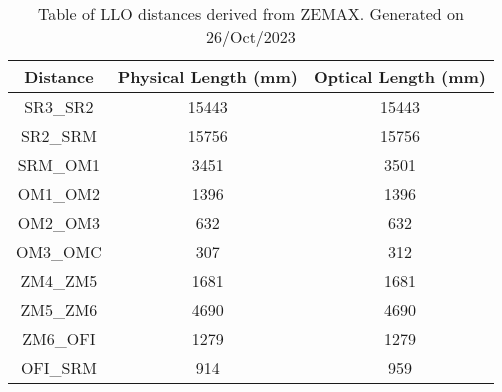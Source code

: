 \documentclass{article}
\begin{document}
\begin{table}[h!] 
\centering  
\begin{tabular}{| c| c | c |} 
\hline \bf{Distance} & \bf{Physical Length (mm)} & \bf{Optical Length (mm)} \\ \hline 
SR3\_SR2 & 15443 & 15443\\ 
SR2\_SRM & 15756 & 15756\\ 
SRM\_OM1 & 3451 & 3501\\ 
OM1\_OM2 & 1396 & 1396\\ 
OM2\_OM3 & 632 & 632\\ 
OM3\_OMC & 307 & 312\\ 
ZM4\_ZM5 & 1681 & 1681\\ 
ZM5\_ZM6 & 4690 & 4690\\ 
ZM6\_OFI & 1279 & 1279\\ 
OFI\_SRM & 914 & 959\\ 
\hline 
\end{tabular} 
\caption{Table of LLO distances derived from ZEMAX. Generated on 26/Oct/2023}
\end{table} 
\end{document}
